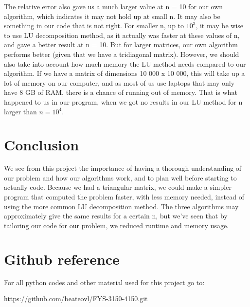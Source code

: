 \documentclass[oneside, final, 11pt, english, twocolumn]{article}
\begin{document}
The relative error also gave us a much larger value at n = 10 for our own algorithm, which indicates it may not hold up at small n. It may also be something in our code that is not right. For smaller n, up to $10^3$, it may be wise to use LU decomposition method, as it actually was faster at these values of n, and gave a better result at n = 10. But for larger matrices, our own algorithm performs better (given that we have a tridiagonal matrix). However, we should also take into account how much memory the LU method needs compared to our algorithm. If we have a matrix of dimensions 10 000 x 10 000, this will take up a lot of memory on our computer, and as most of us use laptops that may only have 8 GB of RAM, there is a chance of running out of memory. That is what happened to us in our program, when we got no results in our LU method for n larger than $n=10^4$.  \\


\section{Conclusion}

We see from this project the importance of having a thorough understanding of our problem and how our algorithms work, and to plan well before starting to actually code. Because we had a triangular matrix, we could make a simpler program that computed the problem faster, with less memory needed, instead of using the more common LU decomposition method. The three algorithms may approximately give the same results for a certain n, but we've seen that by tailoring our code for our problem, we reduced runtime and memory usage. 

\section{Github reference}

For all python codes and other material used for this project go to: 

https://github.com/beateovl/FYS-3150-4150.git



{}

\end{document}
